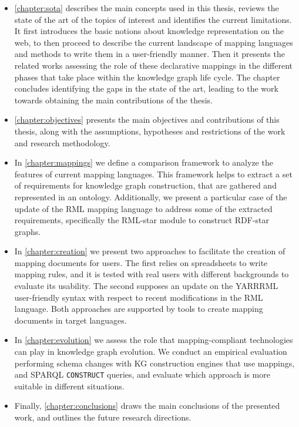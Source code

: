 \begin{itemize}
    \item \cref{chapter:sota} describes the main concepts used in this thesis, reviews the state of the art of the topics of interest and identifies the current limitations. It first introduces the basic notions about knowledge representation on the web, to then proceed to describe the current landscape of mapping languages and methods to write them in a user-friendly manner. Then it presents the related works assessing the role of these declarative mappings in the different phases that take place within the knowledge graph life cycle. The chapter concludes identifying the gaps in the state of the art, leading to the work towards obtaining the main contributions of the thesis.
    
    \item \cref{chapter:objectives} presents the main objectives and contributions of this thesis, along with the assumptions, hypotheses and restrictions of the work and research methodology. 
    
    \item In \cref{chapter:mappings} we define a comparison framework to analyze the features of current mapping languages. This framework helps to extract a set of requirements for knowledge graph construction, that are gathered and represented in an ontology. Additionally, we present a particular case of the update of the RML mapping language to address some of the extracted requirements, specifically the RML-star module to construct RDF-star graphs.
    
    \item In \cref{chapter:creation} we present two approaches to facilitate the creation of mapping documents for users. The first relies on spreadsheets to write mapping rules, and it is tested with real users with different backgrounds to evaluate its usability. The second supposes an update on the YARRRML user-friendly syntax with respect to recent modifications in the RML language. Both approaches are supported by tools to create mapping documents in target languages. 
    
    \item In \cref{chapter:evolution} we assess the role that mapping-compliant technologies can play in knowledge graph evolution. We conduct an empirical evaluation performing schema changes with KG construction engines that use mappings, and SPARQL \texttt{CONSTRUCT} queries, and evaluate which approach is more suitable in different situations. 
    
    \item Finally, \cref{chapter:conclusions} draws the main conclusions of the presented work, and outlines the future research directions. 
    
\end{itemize}



